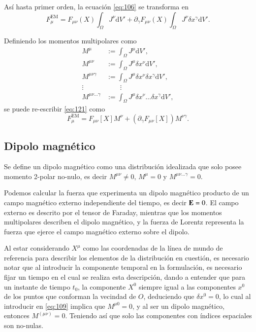 Así hasta primer orden, la ecuación \eqref{eq:106} se transforma en
\begin{equation}
\label{eq:121}
F^{\mathrm{EM}}_{\mu} = F_{\mu \nu}(X) \int_{\Omega} J^{\nu} \mathrm{d}V' + \partial_{\gamma} F_{\mu \nu}(X) \int_{\Omega} J^{\nu} \delta x^{\gamma} \mathrm{d}V'.
\end{equation}

Definiendo los momentos multipolares como
\begin{align}
\label{eq:108}
M^{\mu} &:= \int_{\Omega} J^{\mu} \mathrm{d}V',\\
\label{eq:109}
M^{\mu \nu} &:= \int_{\Omega} J^{\mu} \delta x^{\nu} \mathrm{d}V',\\
M^{\mu \nu \gamma} &:= \int_{\Omega} J^{\mu} \delta x^{\nu} \delta x^{\gamma} \mathrm{d}V',\\
\vdots & \qquad \vdots \nonumber \\
M^{\mu \nu \dots \gamma} &:= \int_{\Omega} J^{\mu} \delta x^{\nu} \dots \delta x^{\gamma} \mathrm{d}V',
\end{align}
se puede re-escribir \eqref{eq:121} como
\begin{equation}
F^{\mathrm{EM}}_{\mu} = F_{\mu \nu}[X] M^{\nu} + \left( \partial_{\gamma} F_{\mu \nu}[X] \right) M^{\nu \gamma}.
\end{equation}


\subsection{Dipolo magnético}

Se define un dipolo magnético como una distribución idealizada que solo posee momento 2-polar no-nulo, es decir $M^{\mu \nu} \neq 0$, $M^{\mu} = 0$ y $M^{\mu \nu \dots \gamma} = 0$.

Podemos calcular la fuerza que experimenta un dipolo magnético producto de un campo magnético externo independiente del tiempo, es decir $\vb{E}=0$. El campo externo es descrito por el tensor de Faraday, mientras que los momentos multipolares describen el dipolo magnético, y la fuerza de Lorentz representa la fuerza que ejerce el campo magnético externo sobre el dipolo.

Al estar considerando $X^{\mu}$ como las coordenadas de la línea de mundo de referencia para describir los elementos de la distribución en cuestión, es necesario notar que al introducir la componente temporal en la formulación, es necesario fijar un tiempo en el cual se realiza esta descripción, dando a entender que para un instante de tiempo $t_0$, la componente $X^0$ siempre igual a las componentes $x^0$ de los puntos que conforman la vecindad de $O$, deduciendo que $\delta x^0 = 0$, lo cual al introducir en \eqref{eq:109} implica que $M^{\mu 0} = 0$, y al ser un dipolo magnético, entonces $M^{(\mu \nu)} = 0$. Teniendo así que solo las componentes con índices espaciales son no-nulas. 

